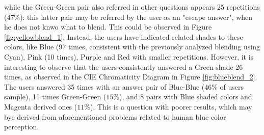 while the Green-Green pair also referred in other questions appears 25 repetitions ($47\%$): this latter pair may be referred
by the user as an "escape answer", when he does not knwo what to blend. This could be observed in Figure \ref{fig:yellowblend_1}.
%
Instead, the users have indicated related shades to these colors,
like Blue (97 times, consistent with the previously analyzed blending using Cyan), Pink (10 times), Purple and Red with smaller repetitions.
However, it is interesting to observe that the users consistently answered a Green shade 26 times, as observed in the CIE Chromaticity Diagram
in Figure \ref{fig:blueblend_2}. The users answered 35 times with an answer pair of Blue-Blue ($46\%$ of users sample), 11 times Green-Green ($15\%$),
and 8 pairs with Blue shaded colors and Magenta derived ones ($11\%$). This is a question with poorer results, which may bye derived from aforementioned
problems related to human blue color perception.
%
